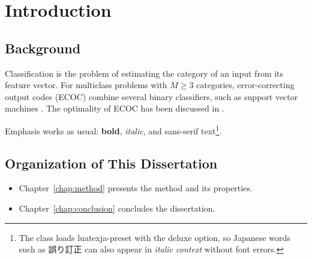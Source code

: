 \chapter{Introduction}

\section{Background}

Classification is the problem of estimating the category of an input from
its feature vector. For multiclass problems with $M \geq 3$ categories,
error-correcting output codes (ECOC) \cite{dietterich1994} combine several
binary classifiers, such as support vector machines \cite{vapnik1998}.
The optimality of ECOC has been discussed in \cite{kumoi2021}.

Emphasis works as usual: \textbf{bold}, \textit{italic}, and
\textsf{sans-serif} text\footnote{The class loads luatexja-preset with the
deluxe option, so Japanese words such as 誤り訂正 can also appear in
\textit{italic context} without font errors.}.

\section{Organization of This Dissertation}

\begin{itemize}
  \item Chapter~\ref{chap:method} presents the method and its properties.
  \item Chapter~\ref{chap:conclusion} concludes the dissertation.
\end{itemize}
